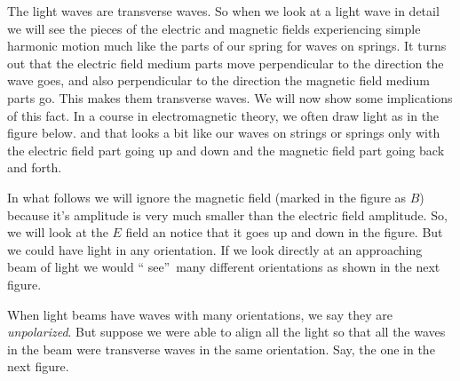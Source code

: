 \documentclass{article}
\begin{document}
The light waves are transverse waves. So when we look at a light wave in
detail we will see the pieces of the electric and magnetic fields
experiencing simple harmonic motion much like the parts of our spring for
waves on springs. It turns out that the electric field medium parts move
perpendicular to the direction the wave goes, and also perpendicular to the
direction the magnetic field medium parts go. This makes them transverse
waves. We will now show some implications of this fact. In a course in
electromagnetic theory, we often draw light as in the figure below.%
and that looks a bit like our waves on strings or springs only with the
electric field part going up and down and the magnetic field part going back
and forth.

In what follows we will ignore the magnetic field (marked in the figure as $%
B $) because it's amplitude is very much smaller than the electric field
amplitude. So, we will look at the $E$ field an notice that it goes up and
down in the figure. But we could have light in any orientation. If we look
directly at an approaching beam of light we would \textquotedblleft
see\textquotedblright\ many different orientations as shown in the next
figure.

When light beams have waves with many orientations, we say they are \emph{%
unpolarized}. But suppose we were able to align all the light so that all
the waves in the beam were transverse waves in the same orientation. Say,
the one in the next figure.
\end{document}
